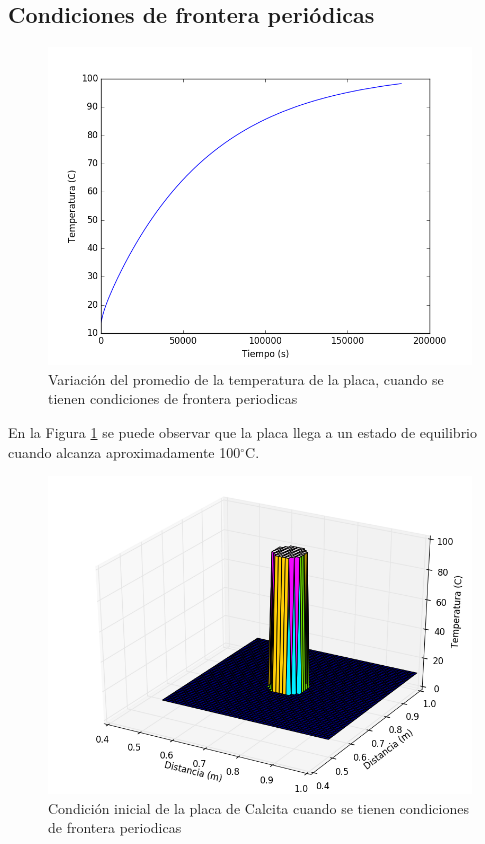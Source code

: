 \documentclass[]{article}
\begin{document}
\subsection{Condiciones de frontera periódicas}
\begin{figure}[H]
    \centering
    \includegraphics[width=\linewidth]{promedioperiodica.png}
    \caption{Variación del promedio de la temperatura de la placa, cuando se tienen condiciones de frontera periodicas}
    \label{fig:promediop}
\end{figure}
En la Figura \ref{fig:promediop} se puede observar que la placa llega a un estado de equilibrio cuando alcanza aproximadamente 100$^\circ$C.\\

\begin{figure}[H]
    \centering
    \includegraphics[width=\linewidth]{placaperiodicainicial.png}
    \caption{Condición inicial de la placa de Calcita cuando se tienen condiciones de frontera periodicas}
    \label{fig:placaperiodicainicial}
\end{figure}
\end{document}
